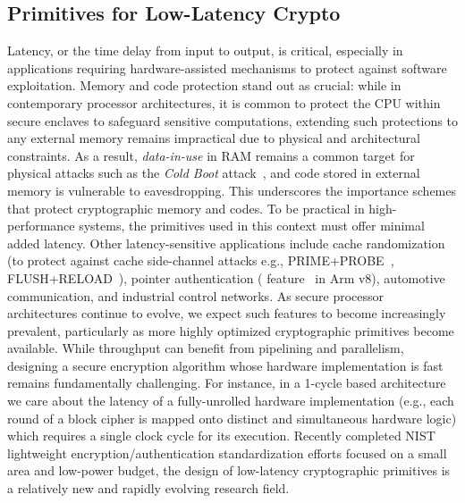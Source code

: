 \subsection{Primitives for Low-Latency Crypto}
Latency, or the time delay from input to output, is critical, especially in applications requiring hardware-assisted mechanisms to protect against software exploitation.
Memory and code protection stand out as crucial: while in contemporary processor architectures, it is common to protect the CPU within secure enclaves to safeguard sensitive computations, extending such protections to any external memory remains impractical due to physical and architectural constraints.
As a result, \emph{data-in-use} in RAM remains a common target for physical attacks such as the \emph{Cold Boot} attack~\cite{DBLP:conf/uss/HaldermanSHCPCFAF08}, and code stored in external memory is vulnerable to eavesdropping.
This underscores the importance schemes that protect cryptographic memory and codes.
To be practical in high-performance systems, the primitives used in this context must offer minimal added latency.
Other latency-sensitive applications include cache randomization (to protect against cache side-channel attacks e.g., \textsf{PRIME+PROBE}~\cite{DBLP:journals/iacr/OsvikST05}, \textsf{FLUSH+RELOAD}~\cite{DBLP:conf/uss/YaromF14}), pointer authentication ( feature~\cite{ARMv8-A-2016-additions} in Arm v8), automotive communication, and industrial control networks.
As secure processor architectures continue to evolve, we expect such features to become increasingly prevalent, particularly as more highly optimized cryptographic primitives become available.
While throughput can benefit from pipelining and parallelism, designing a secure encryption algorithm whose hardware implementation is fast remains fundamentally challenging.
For instance, in a 1-cycle based architecture we care about the latency of a fully-unrolled hardware implementation (e.g., each round of a block cipher is mapped onto distinct and simultaneous hardware logic) which requires a single clock cycle for its execution.
Recently completed NIST lightweight encryption/authentication standardization efforts focused on a small area and low-power budget, the design of low-latency cryptographic primitives is a relatively new and rapidly evolving research field.

